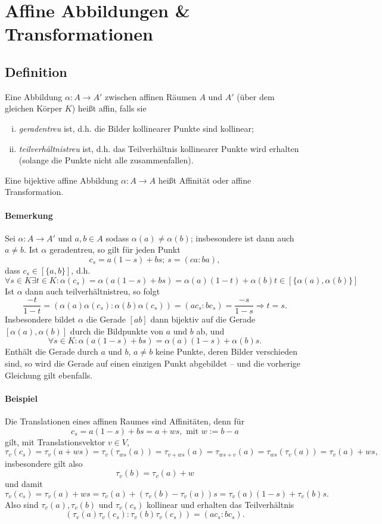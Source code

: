 
\section{Affine Abbildungen \& Transformationen}
\subsection{Definition}
	\begin{Definition}
		Eine Abbildung $ \alpha:A\to A' $ zwischen affinen Räumen $ A $ und $ A' $ (über dem gleichen Körper $ K $) heißt affin, falls sie
			\begin{enumerate}[(i)]
				\item \emph{geradentreu} ist, d.h. die Bilder kollinearer Punkte sind kollinear;
				\item \emph{teilverhältnistreu} ist, d.h. das Teilverhältnis kollinearer Punkte wird erhalten (solange die Punkte nicht alle zusammenfallen).
			\end{enumerate}
		Eine bijektive affine Abbildung $ \alpha:A\to A $ heißt Affinität oder affine Transformation.
	\end{Definition}
	
\paragraph{Bemerkung}
	Sei $ \alpha:A\to A' $ und $ a,b\in A $ sodass $ \alpha(a)\neq \alpha(b) $; insbesondere ist dann auch $ a\neq b $. Ist $ \alpha $ geradentreu, so gilt für jeden Punkt
		\[ c_s = a(1-s)+bs;\ s=(ca:ba), \]
	dass $ c_s\in [\{a,b\}] $, d.h.
		\[ \forall s\in K\exists t\in K:\alpha(c_s) = \alpha(a(1-s)+bs) = \alpha(a)(1-t)+\alpha(b)t \in [\{\alpha(a),\alpha(b)\}] \]
	Ist $ \alpha $ dann auch teilverhältnistreu, so folgt
		\[ \frac{-t}{1-t} = (\alpha(a)\alpha(c_s):\alpha(b)\alpha(c_s)) = (ac_s:bc_s) = \frac{-s}{1-s} \Rightarrow t = s. \]
	Insbesondere bildet $ \alpha $ die Gerade $ [ab] $ dann bijektiv auf die Gerade $ [\alpha(a),\alpha(b)] $ durch die Bildpunkte von $ a $ und $ b $ ab, und 
		\[ \forall s\in K:\alpha(a(1-s)+bs)=\alpha(a)(1-s)+\alpha(b)s. \]
	Enthält die Gerade durch $ a $ und $ b $, $ a\neq b $ keine Punkte, deren Bilder verschieden sind, so wird die Gerade auf einen einzigen Punkt abgebildet -- und die vorherige Gleichung gilt ebenfalls.
	
\paragraph{Beispiel}
	Die Translationen eines affinen Raumes sind Affinitäten, denn für
		\[ c_s = a(1-s)+bs = a + ws, \text{ mit } w:=b-a \]
	gilt, mit Translationsvektor $ v\in V $,
		\[ \tau_v(c_s) = \tau_v(a+ws) = \tau_v(\tau_{ws}(a)) = \tau_{v+ws}(a) = \tau_{ws+v}(a) = \tau_{ws}(\tau_v(a)) =  \tau_v(a) + ws, \]
	insbesondere gilt also
		\[ \tau_v(b) = \tau_v(a)+w \]
	und damit
		\[ \tau_v(c_s) = \tau_v(a)+ws = \tau_v(a)+(\tau_v(b)-\tau_v(a))s = \tau_v(a)(1-s)+\tau_v(b)s.\]
	Also sind $ \tau_v(a),\tau_v(b) $ und $ \tau_v(c_s) $ kollinear und erhalten das Teilverhältnis
		\[ (\tau_v(a)\tau_v(c_s):\tau_v(b)\tau_v(c_s)) = (ac_s:bc_s). \]
		
